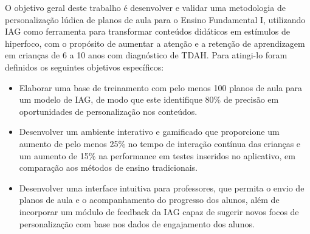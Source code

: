 
O objetivo geral deste trabalho é desenvolver e validar uma metodologia de personalização lúdica de planos de aula para o Ensino Fundamental I, utilizando IAG como ferramenta para transformar conteúdos didáticos em estímulos de hiperfoco, com o propósito de aumentar a atenção e a retenção de aprendizagem em crianças de 6 a 10 anos com diagnóstico de TDAH. Para atingi-lo foram definidos os seguintes objetivos específicos:\\


\begin{itemize}
    \item Elaborar uma base de treinamento com pelo menos 100 planos de aula para um modelo de IAG, de modo que este identifique 80\% de precisão em oportunidades de personalização nos conteúdos.\\
    \item Desenvolver um ambiente interativo e gamificado que proporcione um aumento de pelo menos 25\% no tempo de interação contínua das crianças e um aumento de 15\% na performance em testes inseridos no aplicativo, em comparação aos métodos de ensino tradicionais.\\
    \item Desenvolver uma interface intuitiva para professores, que permita o envio de planos de aula e o acompanhamento do progresso dos alunos, além de incorporar um módulo de feedback da IAG capaz de sugerir novos focos de personalização com base nos dados de engajamento dos alunos.\\
\end{itemize}
